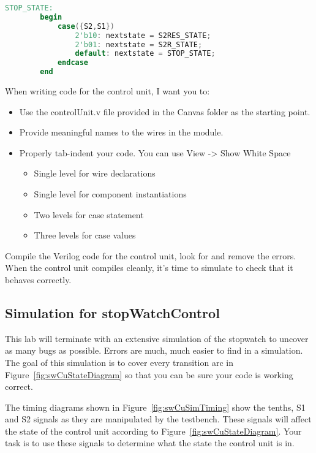 \begin{lstlisting}[language=Verilog,  frame=single]
	STOP_STATE:
		begin
			case({S2,S1})
				2'b10: nextstate = S2RES_STATE;
				2'b01: nextstate = S2R_STATE;
				default: nextstate = STOP_STATE;
			endcase
		end
\end{lstlisting}

When writing code for the control unit, I want you to:

\begin{itemize}
\item
  Use the controlUnit.v file provided in the Canvas folder as the
  starting point.
\item
  Provide meaningful names to the wires in the module.
\item
  Properly tab-indent your code. You can use View -\textgreater{} Show
  White Space

  \begin{itemize}
  \item
    Single level for wire declarations
  \item
    Single level for component instantiations
  \item
    Two levels for case statement
  \item
    Three levels for case values
  \end{itemize}
\end{itemize}

Compile the Verilog code for the control unit, look for and remove the
errors. When the control unit compiles cleanly, it's time to simulate to
check that it behaves correctly.

\subsection{Simulation for stopWatchControl}
This lab will terminate with an extensive simulation of the stopwatch to 
uncover as many bugs as
possible. Errors are much, much easier to find in a
simulation. The goal of this simulation is to cover every transition arc
in Figure~\ref{fig:swCuStateDiagram} so that you can be sure your code is working correct.

The timing diagrams shown in Figure~\ref{fig:swCuSimTiming} show the tenths,
S1 and S2 signals as they are manipulated by the testbench. These
signals will affect the state of the control unit according to Figure~\ref{fig:swCuStateDiagram}.
Your task is to use these signals to determine what the state the
control unit is in.

